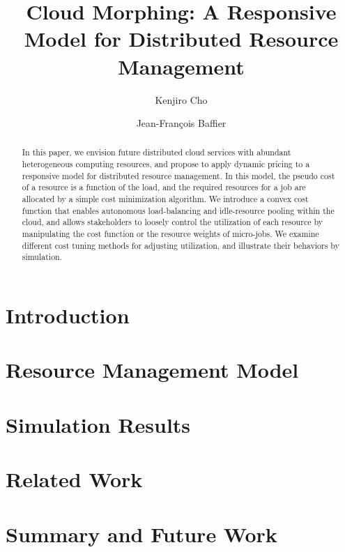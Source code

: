 \documentclass[10pt,sigconf,letterpaper,nonacm]{acmart}
\title{Cloud Morphing: A Responsive Model for Distributed Resource Management}
\author{Kenjiro Cho}
\affiliation{IIJ Research Lab}
\author{Jean-François Baffier}
\affiliation{IIJ Research Lab}
\begin{document}
\begin{abstract}

    In this paper, we envision future distributed cloud services with
    abundant heterogeneous computing resources,
    and propose to apply dynamic pricing to a responsive model for
    distributed resource management.
    In this model, the pseudo cost of a resource is a function of the
    load, and the required resources for a job are allocated by a simple
    cost minimization algorithm.
    We introduce a convex cost function that enables autonomous
    load-balancing and idle-resource pooling within the cloud, and allows
    stakeholders to loosely control the utilization of each resource by
    manipulating the cost function or the resource weights of micro-jobs.
    We examine different cost tuning methods for adjusting
    utilization, and illustrate their behaviors by simulation.

\end{abstract}

\maketitle

\section{Introduction}



\section{Resource Management Model}



\section{Simulation Results}



\section{Related Work}



\section{Summary and Future Work}





\end{document}
